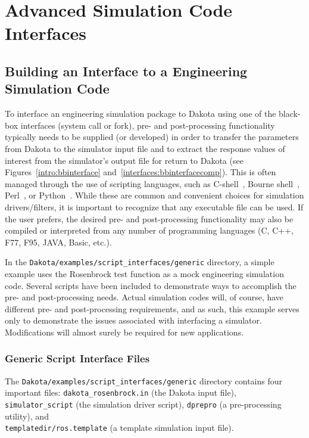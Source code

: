 \chapter{Advanced Simulation Code Interfaces}\label{advint}

\section{Building an Interface to a Engineering Simulation Code}\label{advint:building}

To interface an engineering simulation package to Dakota using one of
the black-box interfaces (system call or fork), pre- and
post-processing functionality typically needs to be supplied (or
developed) in order to transfer the parameters from Dakota to the
simulator input file and to extract the response values of interest
from the simulator's output file for return to Dakota (see
Figures~\ref{intro:bbinterface}
and~\ref{interfaces:bbinterfacecomp}). This is often managed through
the use of scripting languages, such as C-shell~\cite{And86}, Bourne
shell~\cite{Bli96}, Perl~\cite{Wal96}, or Python~\cite{Mar03}. While
these are common and convenient choices for simulation
drivers/filters, it is important to recognize that any executable file
can be used. If the user prefers, the desired pre- and post-processing
functionality may also be compiled or interpreted from any number of
programming languages (C, C++, F77, F95, JAVA, Basic, etc.).

In the \texttt{Dakota/examples/script\_interfaces/generic} directory, a
simple example uses the Rosenbrock test function as a mock engineering
simulation code. Several scripts have been included to demonstrate
ways to accomplish the pre- and post-processing needs. Actual
simulation codes will, of course, have different pre- and
post-processing requirements, and as such, this example serves only to
demonstrate the issues associated with interfacing a
simulator. Modifications will almost surely be required for new
applications.

\subsection{Generic Script Interface Files} 

The {\tt Dakota/examples/script\_interfaces/generic} directory contains four important files:
\texttt{dakota\_rosenbrock.in} (the Dakota input file),
\texttt{simulator\_script} (the simulation driver script),
\texttt{dprepro} (a pre-processing utility), and \\
\texttt{templatedir/ros.template} (a template simulation input file).

